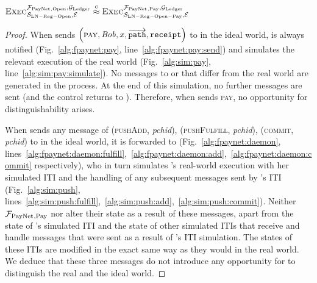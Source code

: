 \begin{lemma}
  \label{lemma:pay}
  $\textsc{Exec}^{\mathcal{F}_{\mathrm{PayNet}}{}_{\mathrm{, Open}}, \mathcal{G}_{\mathrm{Ledger}}}_{\mathcal{S}_{\mathrm{LN
  - Reg - Open}}, \mathcal{E}} \overset{c}{\approx}
  \textsc{Exec}^{\mathcal{F}_{\mathrm{PayNet}}{}_{\mathrm{, Pay}}, \mathcal{G}_{\mathrm{Ledger}}}_{\mathcal{S}_{\mathrm{LN -
  Reg - Open - Pay}}, \mathcal{E}}$
\end{lemma}

\begin{proof}
  When \environment{} sends $\left(\textsc{pay}, \mathit{Bob}, x,
  \overrightarrow{\mathtt{path}}, \mathtt{receipt}\right)$ to \alice{} in the
  ideal world, \simulator{} is always notified (Fig.~\ref{alg:fpaynet:pay},
  line~\ref{alg:fpaynet:pay:send}) and simulates the relevant execution of the
  real world (Fig.~\ref{alg:sim:pay}, line~\ref{alg:sim:pay:simulate}). No
  messages to \ledger{} or \environment{} that differ from the real world are
  generated in the process. At the end of this simulation, no further messages
  are sent (and the control returns to \environment). Therefore, when
  \environment{} sends \textsc{pay}, no opportunity for distinguishability
  arises.

  When \environment{} sends any message of (\textsc{pushAdd}, \textit{pchid}),
  (\textsc{pushFulfill}, \textit{pchid}), (\textsc{commit}, \textit{pchid}) to
  \alice{} in the ideal world, it is forwarded to \simulator{}
  (Fig.~\ref{alg:fpaynet:daemon},
  lines~\ref{alg:fpaynet:daemon:fulfill},~\ref{alg:fpaynet:daemon:add},~\ref{alg:fpaynet:daemon:commit}
  respectively), who in turn simulates \alice's real-world execution with her
  simulated ITI and the handling of any subsequent messages sent by \alice's ITI
  (Fig.~\ref{alg:sim:push},
  lines~\ref{alg:sim:push:fulfill},~\ref{alg:sim:push:add},~\ref{alg:sim:push:commit}).
  Neither $\mathcal{F}_{\mathrm{PayNet}}{}_{\mathrm{, Pay}}$ nor \simulator{} alter their state as a
  result of these messages, apart from the state of \alice's simulated ITI and
  the state of other simulated ITIs that receive and handle messages that were
  sent as a result of \alice's ITI simulation. The states of these ITIs are
  modified in the exact same way as they would in the real world. We deduce that
  these three messages do not introduce any opportunity for \environment{} to
  distinguish the real and the ideal world.


\end{proof}
